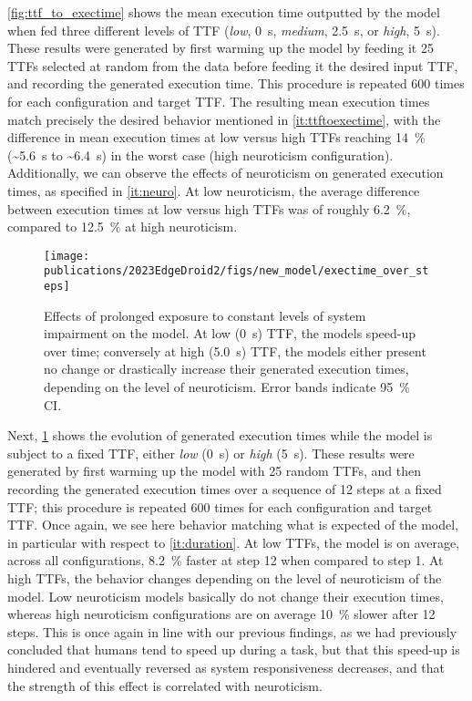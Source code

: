 \cref{fig:ttf_to_exectime} shows the mean execution time outputted by the model when fed three different levels of \gls{TTF} (\emph{low}, \SI{0}{\second}, \emph{medium}, \SI{2.5}{\second}, or \emph{high}, \SI{5}{\second}).
These results were generated by first warming up the model by feeding it \num{25} \glspl{TTF} selected at random from the data before feeding it the desired input \gls{TTF}, and recording the generated execution time.
This procedure is repeated \num{600} times for each configuration and target \gls{TTF}.
The resulting mean execution times match precisely the desired behavior mentioned in \cref{it:ttftoexectime}, with the difference in mean execution times at low versus high \glspl{TTF} reaching \SI{14}{\percent} (\textasciitilde\SI{5.6}{\second} to \textasciitilde\SI{6.4}{\second}) in the worst case (high neuroticism configuration).
Additionally, we can observe the effects of neuroticism on generated execution times, as specified in \cref{it:neuro}.
At low neuroticism, the average difference between execution times at low versus high \glspl{TTF} was of roughly \SI{6.2}{\percent}, compared to \SI{12.5}{\percent} at high neuroticism.

\begin{figure}
    \centering
    \texttt{[image: publications/2023EdgeDroid2/figs/new\_model/exectime\_over\_steps]}
    \caption{%
    Effects of prolonged exposure to constant levels of system impairment on the model.
    At low (\SI{0}{\second}) \gls{TTF}, the models speed-up over time; conversely at high (\SI{5.0}{\second}) \gls{TTF}, the models either present no change or drastically increase their generated execution times, depending on the level of neuroticism.
    Error bands indicate \SI{95}{\percent} \gls{CI}.
    }\label{fig:exectimeduration}
\end{figure}

Next, \cref{fig:exectimeduration} shows the evolution of generated execution times while the model is subject to a fixed \gls{TTF}, either \emph{low} (\SI{0}{\second}) or \emph{high} (\SI{5}{\second}).
These results were generated by first warming up the model with \num{25} random \glspl{TTF}, and then recording the generated execution times over a sequence of \num{12} steps at a fixed \gls{TTF}; this procedure is repeated \num{600} times for each configuration and target \gls{TTF}.
Once again, we see here behavior matching what is expected of the model, in particular with respect to \cref{it:duration}.
At low \glspl{TTF}, the model is on average, across all configurations, \SI{8.2}{\percent} faster at step \num{12} when compared to step \num{1}.
At high \glspl{TTF}, the behavior changes depending on the level of neuroticism of the model.
Low neuroticism models basically do not change their execution times, whereas high neuroticism configurations are on average \SI{10}{\percent} slower after \num{12} steps.
This is once again in line with our previous findings, as we had previously concluded that humans tend to speed up during a task, but that this speed-up is hindered and eventually reversed as system responsiveness decreases, and that the strength of this effect is correlated with neuroticism.

